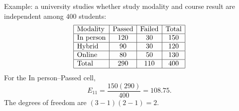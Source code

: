\begin{solproblema}[prob:a5524c8]
Example: a university studies whether study modality and course result are independent among $400$ students:
\[
\begin{array}{|l|c|c|c|}\hline
\text{Modality} & \text{Passed} & \text{Failed} & \text{Total}\\\hline
\text{In person} & 120 & 30 & 150\\\hline
\text{Hybrid} & 90 & 30 & 120\\\hline
\text{Online} & 80 & 50 & 130\\\hline
\text{Total} & 290 & 110 & 400\\\hline
\end{array}
\]
For the In person--Passed cell,
\[
	E_{11}=\frac{150(290)}{400}=108.75.
\]
The degrees of freedom are $(3-1)(2-1)=2$.
\end{solproblema}
